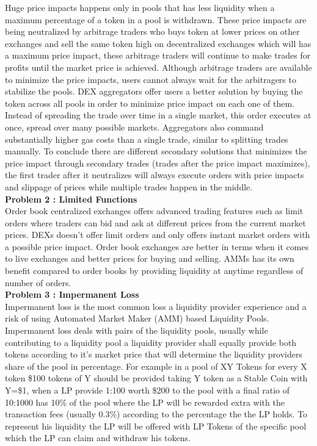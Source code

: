 \documentclass[letterpaper,11pt]{article}
\begin{document}
Huge price impacts happens only in pools that has less liquidity when a maximum percentage of a token in a pool is withdrawn. These price impacts are being neutralized by arbitrage traders who buys token at lower prices on other exchanges and sell the same token high on decentralized exchanges which will has a maximum price impact, these arbitrage traders will continue to make trades for profits until the market price is achieved. Although arbitrage traders are available to minimize the price impacts, users cannot always wait for the arbitragers to stabilize the pools. DEX aggregators offer users a better solution by buying the token across all pools in order to minimize price impact on each one of them. Instead of spreading the trade over time in a single market, this order executes at once, spread over many possible markets. Aggregators also command substantially higher gas costs than a single trade, similar to splitting trades manually. To conclude there are different secondary solutions that minimizes the price impact through secondary trades (trades after the price impact maximizes), the first trader after it neutralizes will always execute orders with price impacts and slippage of prices while multiple trades happen in the middle.\\

\textbf{Problem 2 : Limited Functions}\\

Order book centralized exchanges offers advanced trading features such as limit orders where traders can bid and ask at different prices from the current market prices. DEXs doesn't offer limit orders and only offers instant market orders with a possible price impact. Order book exchanges are better in terms when it comes to live exchanges and better prices for buying and selling. AMMs has its own benefit compared to order books by providing liquidity at anytime regardless of number of orders.\\

\textbf{Problem 3 : Impermanent Loss}\\

Impermanent loss is the most common loss a liquidity provider experience and a risk of using Automated Market Maker (AMM) based Liquidity Pools. Impermanent loss deals with pairs of the liquidity pools, usually while contributing to a liquidity pool a liquidity provider shall equally provide both tokens according to it's market price that will determine the liquidity providers share of the pool in percentage. For example in a pool of XY Tokens for every X token \$100 tokens of Y should be provided taking Y token as a Stable Coin with Y=\$1, when a LP provide 1:100 worth \$200 to the pool with a final ratio of 10:1000 has 10\% of the pool where the LP will be rewarded extra with the transaction fees (usually 0.3\%) according to the percentage the the LP holds. To represent his liquidity the LP will be offered with LP Tokens of the specific pool which the LP can claim and withdraw his tokens.\\
\end{document}
